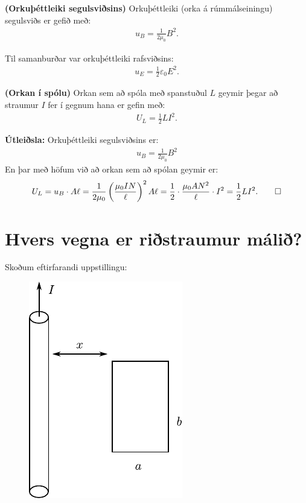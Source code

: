 \ifdefined \wholebook \else\documentclass[oneside]{book}\usepackage{EdlBook}\graphicspath{{figures/}}
\begin{document}
\begin{tcolorbox}
\begin{theorem}
\textbf{(Orkuþéttleiki segulsviðsins)} Orkuþéttleiki (orka á rúmmálseiningu) segulsviðs er gefið með:
\begin{align*}
    u_B = \frac{1}{2\mu_0}B^2.
\end{align*}
\end{theorem}
\end{tcolorbox}

Til samanburðar var orkuþéttleiki rafsviðsins:
\begin{align*}
    u_E = \frac{1}{2}\varepsilon_0 E^2.
\end{align*}



\begin{tcolorbox}
\begin{theorem}
\textbf{(Orkan í spólu)} Orkan sem að spóla með spanstuðul $L$ geymir þegar að straumur $I$ fer í gegnum hana er gefin með:
\begin{align*}
    U_L = \frac{1}{2}LI^2.
\end{align*}
\end{theorem}
\end{tcolorbox}

\textbf{Útleiðsla:} Orkuþéttleiki segulsviðsins er:
\begin{align*}
    u_B = \frac{1}{2\mu_0}B^2
\end{align*}
En þar með höfum við að orkan sem að spólan geymir er:
\begin{align*}
   U_L =  u_B \cdot A \ell = \frac{1}{2\mu_0} \left( \frac{\mu_0 I N}{\ell} \right)^2 A \ell = \frac{1}{2} \cdot \frac{\mu_0 A N^2}{\ell} \cdot I^2 = \frac{1}{2}L I^2. \qed
\end{align*}

\section{Hvers vegna er riðstraumur málið?}

Skoðum eftirfarandi uppstillingu:

\begin{figure}[H]
    \centering
    \includegraphics{figures/straumur-vir.pdf}
\end{figure}
\end{document}
